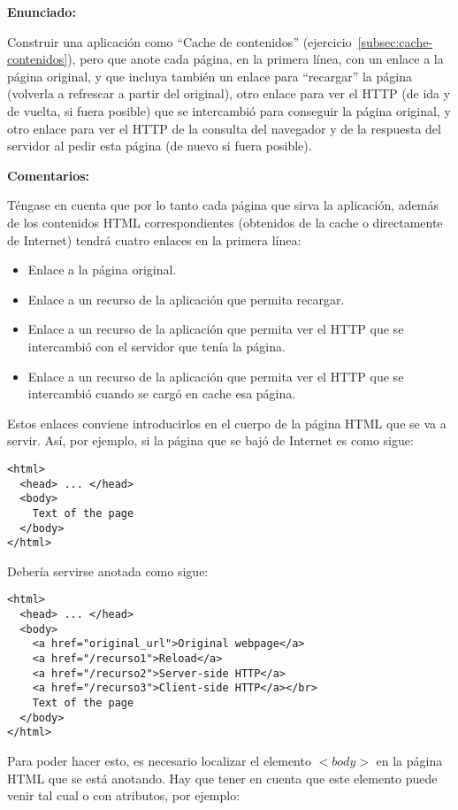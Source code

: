 \textbf{Enunciado:}

Construir una aplicación como ``Cache de contenidos'' (ejercicio~\ref{subsec:cache-contenidos}), pero que anote cada página, en la primera línea, con un enlace a la página original, y que incluya también un enlace para ``recargar'' la página (volverla a refrescar a partir del original), otro enlace para ver el HTTP (de ida y de vuelta, si fuera posible) que se intercambió para conseguir la página original, y otro enlace para ver el HTTP de la consulta del navegador y de la respuesta del servidor al pedir esta página (de nuevo si fuera posible).

\textbf{Comentarios:}

Téngase en cuenta que por lo tanto cada página que sirva la aplicación, además de los contenidos  HTML correspondientes (obtenidos de la cache o directamente de Internet) tendrá cuatro enlaces en la primera línea:

\begin{itemize}
\item Enlace a la página original.
\item Enlace a un recurso de la aplicación que permita recargar.
\item Enlace a un recurso de la aplicación que permita ver el HTTP que se intercambió con el servidor que tenía la página.
\item Enlace a un recurso de la aplicación que permita ver el HTTP que se intercambió cuando se cargó en cache esa página.
\end{itemize}

Estos enlaces conviene introducirlos en el cuerpo de la página HTML que se va a servir. Así, por ejemplo, si la página que se bajó de Internet es como sigue:

\begin{verbatim}
<html>
  <head> ... </head>
  <body>
    Text of the page
  </body>
</html>
\end{verbatim}

Debería servirse anotada como sigue:

\begin{verbatim}
<html>
  <head> ... </head>
  <body>
    <a href="original_url">Original webpage</a>
    <a href="/recurso1">Reload</a>
    <a href="/recurso2">Server-side HTTP</a>
    <a href="/recurso3">Client-side HTTP</a></br>
    Text of the page
  </body>
</html>
\end{verbatim}

Para poder hacer esto, es necesario localizar el elemento $<body>$ en la página HTML que se está anotando. Hay que tener en cuenta que este elemento puede venir tal cual o con atributos, por ejemplo:

